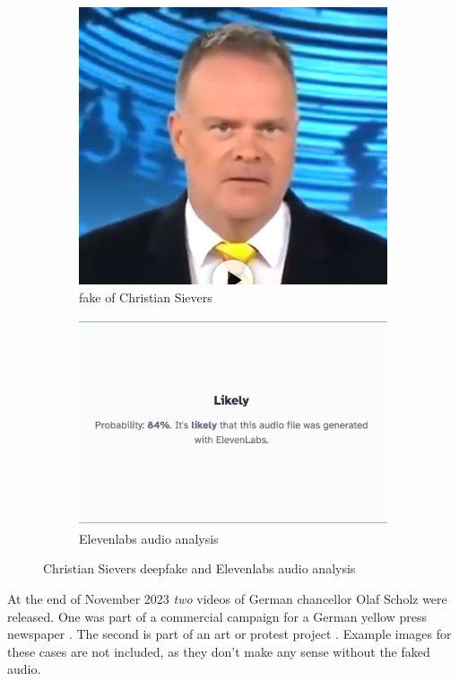 \documentclass[
  a4paper,  %
  twoside,  %
  bibliography=totoc,
  headsepline,
  cleardoublepage=empty,
  parskip=half,
  draft=false
]{scrbook}
\begin{document}
\begin{figure}[h]
  \centering
  \begin{subfigure}[b]{0.45\textwidth}
    \includegraphics[width=\textwidth]{./graphics/images/sievers.png}
    \caption{fake of Christian Sievers \cite{zdfDeepfakeMitZDFModerator}}
    \label{fig:sievers-fake}
  \end{subfigure}
  \hfill
  \begin{subfigure}[b]{0.5\textwidth}
    \includegraphics[width=\textwidth]{./graphics/images/sievers-11labs.png}
    \caption{Elevenlabs audio analysis \cite{elevenlabsAISpeechClassifier}}
    \label{fig:sievers-11labs}
  \end{subfigure}
  \caption{Christian Sievers deepfake and Elevenlabs audio analysis}
\end{figure}
At the end of November 2023 \textit{two} videos of German chancellor Olaf Scholz were released. One was part of a commercial campaign for a German yellow press newspaper \cite{dwdl.deSpringerTrommeltMit}. The second is part of an art or protest project \cite{zdfKunstinstallationDeepfakeScholzVerkuendet}. Example images for these cases are not included, as they don't make any sense without the faked audio. 
\end{document}
